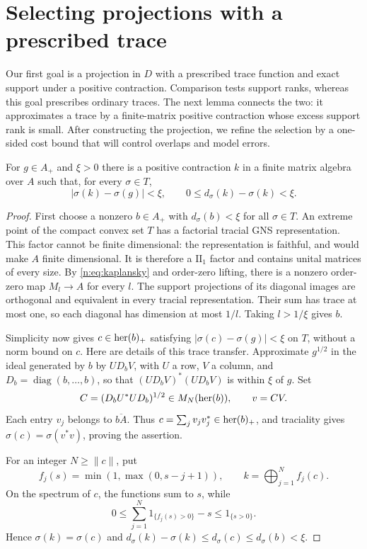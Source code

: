 \section{Selecting projections with a prescribed trace}\label{n:sec:selection}

Our first goal is a projection in $D$ with a prescribed trace function
and exact support under a positive contraction. Comparison tests support
ranks, whereas this goal prescribes ordinary traces. The next lemma
connects the two: it approximates a trace by a finite-matrix positive
contraction whose excess support rank is small. After constructing the
projection, we refine the selection by a one-sided cost bound that will
control overlaps and model errors.

\begin{lemma}\label{n:lem:rank}
For $g\in A_+$ and $\xi>0$ there is a positive contraction $k$ in a finite
matrix algebra over $A$ such that, for every $\sigma\in T$,
\begin{equation}\label{n:eq:rank}
 |\sigma(k)-\sigma(g)|<\xi,\qquad
 0\le d_\sigma(k)-\sigma(k)<\xi.
\end{equation}
\end{lemma}
\begin{proof}
First choose a nonzero $b\in A_+$ with $d_\sigma(b)<\xi$ for all
$\sigma\in T$. An extreme point of the compact convex set $T$ has a
factorial tracial GNS representation. This factor cannot be finite
dimensional: the representation is faithful, and would make $A$
finite dimensional. It is therefore a $\mathrm{II}_1$ factor and contains
unital matrices of every size. By \eqref{n:eq:kaplansky} and order-zero
lifting, there is a nonzero order-zero map $M_l\to A$ for every $l$.
The support projections of its diagonal images are orthogonal and
equivalent in every tracial representation. Their sum has trace at most
one, so each diagonal has dimension at most $1/l$. Taking $l>1/\xi$
gives $b$.

Simplicity now gives $c\in\operatorname{her}(b)_+$ satisfying
$|\sigma(c)-\sigma(g)|<\xi$ on $T$, without a norm bound on $c$.
Here are details of this trace transfer. Approximate $g^{1/2}$ in the
ideal generated by $b$ by $UD_bV$, with $U$ a row, $V$ a column, and
$D_b=\operatorname{diag}(b,\ldots,b)$, so that
$(UD_bV)^*(UD_bV)$ is within $\xi$ of $g$. Set
\[
 C=(D_bU^*UD_b)^{1/2}\in M_N(\operatorname{her}(b)),\qquad v=CV.
\]
Each entry $v_j$ belongs to $\overline{bA}$. Thus
$c=\sum_jv_jv_j^*\in\operatorname{her}(b)_+$, and traciality gives
$\sigma(c)=\sigma(v^*v)$, proving the assertion.

For an integer $N\ge\|c\|$, put
\[
 f_j(s)=\min(1,\max(0,s-j+1)),\qquad
 k=\bigoplus_{j=1}^N f_j(c).
\]
On the spectrum of $c$, the functions sum to $s$, while
\[
 0\le\sum_{j=1}^N1_{\{f_j(s)>0\}}-s\le1_{\{s>0\}}.
\]
Hence $\sigma(k)=\sigma(c)$ and
$d_\sigma(k)-\sigma(k)\le d_\sigma(c)\le d_\sigma(b)<\xi$.
\end{proof}

